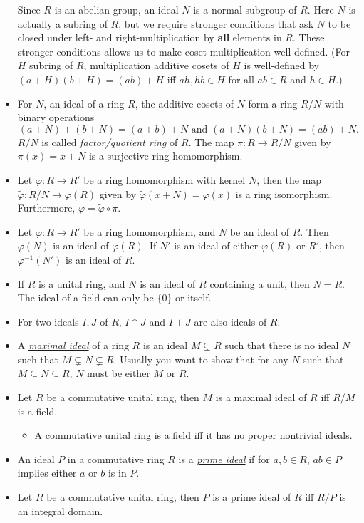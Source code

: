 \documentclass{article}
\newcommand{\df}[1]{\ul{\textit{#1}}}
\renewcommand{\phi}{\varphi}
\begin{document}
\begin{itemize}
    Since $R$ is an abelian group, an ideal $N$ is a normal subgroup of $R$. Here $N$ is actually a subring of $R$, but we require stronger conditions that ask $N$ to be closed under left- and right-multiplication by \textbf{all} elements in $R$. These stronger conditions allows us to make coset multiplication well-defined. (For $H$ subring of $R$, multiplication additive cosets of $H$ is well-defined by $(a+H)(b+H)=(ab)+H$ iff $ah,hb \in H$ for all $ab \in R$ and $h \in H$.)
    \item For $N$, an ideal of a ring $R$, the additive cosets of $N$ form a ring $R/N$ with binary operations 
    \[(a+N)+(b+N)=(a+b)+N \text{ and } (a+N)(b+N) = (ab)+N.\] $R/N$ is called \df{factor/quotient ring} of $R$. The map $\pi: R \to R/N$ given by $\pi(x) = x + N$ is a surjective ring homomorphism.
    \item Let $\phi: R \to R'$ be a ring homomorphism with kernel $N$, then the map $\tilde{\phi}: R/N \to \phi(R)$ given by $\tilde{\phi}(x+N) = \phi(x)$ is a ring isomorphism. Furthermore, $\phi = \tilde{\phi} \circ \pi$.
    \item Let $\phi: R \to R'$ be a ring homomorphism, and $N$ be an ideal of $R$. Then $\phi(N)$ is an ideal of $\phi(R)$. If $N'$ is an ideal of either $\phi(R)$ or $R'$, then $\phi^{-1}(N')$ is an ideal of $R$.
    \item If $R$ is a unital ring, and $N$ is an ideal of $R$ containing a unit, then $N = R$. The ideal of a field can only be $\{0\}$ or itself.
    \item For two ideals $I,J$ of $R$, $I \cap J$ and $I + J$ are also ideals of $R$.
    \item A \df{maximal ideal} of a ring $R$ is an ideal $M \subsetneq R$ such that there is no ideal $N$ such that $M \subsetneq N \subsetneq R$. Usually you want to show that for any $N$ such that $M \subseteq N \subseteq R$, $N$ must be either $M$ or $R$.
    \item Let $R$ be a commutative unital ring, then $M$ is a maximal ideal of $R$ iff $R/M$ is a field.
    \begin{itemize}
        \item A commutative unital ring is a field iff it has no proper nontrivial ideals.
    \end{itemize}
    \item An ideal $P$ in a commutative ring $R$ is a \df{prime ideal} if for $a,b \in R$, $ab \in P$ implies either $a$ or $b$ is in $P$.
    \item Let $R$ be a commutative unital ring, then $P$ is a prime ideal of $R$ iff $R/P$ is an integral domain.

\end{itemize}
\end{document}
